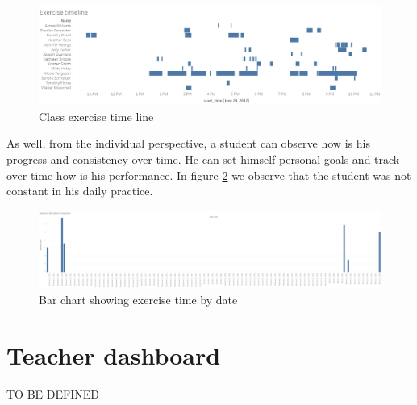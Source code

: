 \begin{figure}[!h]
	\centering
	\includegraphics[width=1\linewidth]{gfx/Exercise_timeline}
	\caption{Class exercise time line}
	\label{fig:Exercise_timeline}
\end{figure}

As well, from the individual perspective, a student can observe how is his progress and consistency over time. He can set himself personal goals and track over time how is his performance. In figure \ref{fig:Session_durations_by_user} we observe that the student was not constant in his daily practice.

\begin{figure}[!h]
	\centering
	\includegraphics[width=1\linewidth]{gfx/Session_durations_by_user}
	\caption{Bar chart showing exercise time by date}
	\label{fig:Session_durations_by_user}
\end{figure}




\section{Teacher dashboard}
TO BE DEFINED